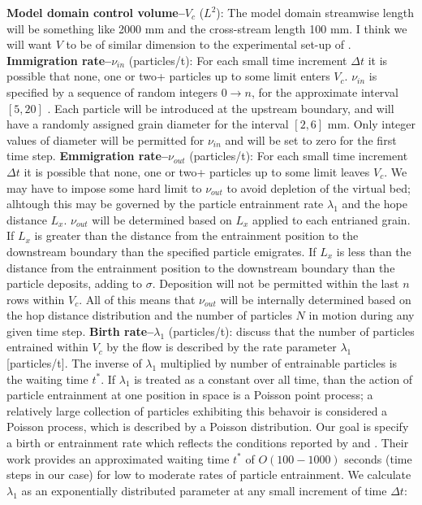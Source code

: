 \documentclass[12pt]{article}
\begin{document}
\begin{outline}[enumerate]
\1 \textbf{Model domain control volume--$V_c$} ($L^2$): The model domain streamwise length will be something like 2000 mm and the cross-stream length 100 mm. I think we will want $V$ to be of similar dimension to the experimental set-up of \citet{Ancey2010JGR}.
%
\1 \textbf{Immigration rate--$\nu_{in}$} (particles/t): For each small time increment $\Delta t$ it is possible that none, one or two+ particles up to some limit enters $V_c$. $\nu_{in}$ is specified by a sequence of random integers $0\rightarrow n$, for the approximate interval $[5,20]$ \citep{Ancey2010JGR}. Each particle will be introduced at the upstream boundary, and will have a randomly assigned grain diameter for the interval $[2,6]$ mm. Only integer values of diameter will be permitted for $\nu_{in}$ and will be set to zero for the first time step.
%
\1 \textbf{Emmigration rate--$\nu_{out}$} (particles/t): For each small time increment $\Delta t$ it is possible that none, one or two+ particles up to some limit leaves $V_c$. We may have to impose some hard limit to $\nu_{out}$ to avoid depletion of the virtual bed; alhtough this may be governed by the particle entrainment rate $\lambda_1$ and the hope distance $L_x$. $\nu_{out}$ will be determined based on $L_x$ applied to each entrianed grain. If $L_x$ is greater than the distance from the entrainment position to the downstream boundary than the specified particle emigrates. If $L_x$ is less than the distance from the entrainment position to the downstream boundary than the particle deposits, adding to $\sigma$. Deposition will not be permitted within the last $n$ rows within $V_c$. All of this means that $\nu_{out}$ will be internally determined based on the hop distance distribution and the number of particles $N$ in motion during any given time step.
%
\1 \textbf{Birth rate--$\lambda_1$} (particles/t): \citet{Ancey_et_al_2008} discuss that the number of particles entrained within $V_c$ by the flow is described by the rate parameter $\lambda_1$ [particles/t]. The inverse of $\lambda_1$ multiplied by number of entrainable particles is the waiting time $t^*$. If $\lambda_1$ is treated as a constant over all time, than the action of particle entrainment at one position in space is a Poisson point process; a relatively large collection of particles exhibiting this behavoir is considered a Poisson process, which is described by a Poisson distribution. Our goal is specify a birth or entrainment rate which reflects the conditions reported by \citet{Ancey_et_al_2008} and \citet{Ancey2010JGR}. Their work provides an approximated waiting time $t^*$ of $O(100-1000)$ seconds (time steps in our case) for low to moderate rates of particle entrainment. We calculate $\lambda_1$ as an exponentially distributed parameter at any small increment of time $\Delta t$:

\end{outline}
\end{document}
